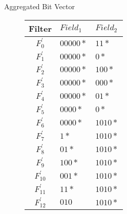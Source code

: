 \documentclass[a4paper,10pt]{jarticle}
\makeatletter
\newcommand{\tblcaption}[1]{\def\@captype{table}\caption{#1}}
\makeatother
\begin{document}
\begin{frame}{Aggregated Bit Vector}
\begin{figure}[h]
\begin{minipage}[t]{.4\textwidth}
{{  }
  }
  \end{minipage}
  \hfill
  \begin{minipage}[c]{.55\textwidth}
  {\footnotesize
  {\centering
  \begin{tabular}{c|l|l} 
   Filter   & $Field_{1}$ & $Field_{2}$ \\ \hline
   $F_{0}^{'} $ & $00000*$    & $11*$   \\ \hline
   $F_{1}^{'} $ & $00000*$    & $0*$    \\ \hline
   $F_{2}^{'} $ & $00000*$    & $100*$   \\ \hline
   $F_{3}^{'} $ & $00000*$    & $000*$  \\ \hline
   $F_{4}^{'} $ & $00000*$    & $01*$   \\ \hline
   $F_{5}^{'} $ & $0000*$    & $0*$   \\ \hline
   $F_{6}^{'} $ & $0000*$    & $1010*$   \\ \hline
   $F_{7}^{'} $ & $1*$        & $1010*$  \\ \hline
   $F_{8}^{'} $ & $01*$       & $1010*$  \\ \hline
   $F_{9}^{'} $ & $100*$      & $1010*$  \\ \hline
   $F_{10}^{'} $ & $001*$      & $1010*$  \\ \hline
   $F_{11}^{'} $ & $11*$      & $1010*$  \\ \hline
   $F_{12}^{'} $ & $010$      & $1010*$ 
  \end{tabular}

  }
  }
  \end{minipage}
\end{figure}

\end{frame}
\end{document}
